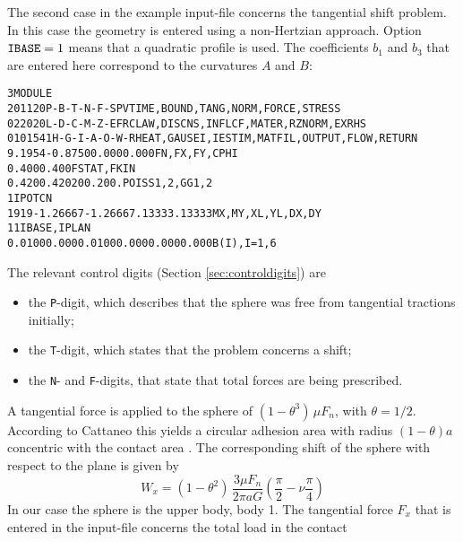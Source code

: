 \documentclass[12pt]{report}
\begin{document}
The second case in the example input-file concerns the tangential shift
problem. In this case the geometry is entered using a non-Hertzian approach.
Option ${\tt IBASE}=1$ means that a quadratic profile is used. The
coefficients $b_1$ and $b_3$ that are entered here correspond to the
curvatures $A$ and $B$:
\begin{alltt}\small
% Second case: using non-Hertzian geometry-description, and including the
%              tangential shift problem.

 3  MODULE
  201120     P-B-T-N-F-S        PVTIME, BOUND , TANG  , NORM , FORCE, STRESS
  022020     L-D-C-M-Z-E        FRCLAW, DISCNS, INFLCF, MATER, RZNORM, EXRHS
 0101541   H-G-I-A-O-W-R  HEAT, GAUSEI, IESTIM, MATFIL, OUTPUT, FLOW, RETURN
  9.1954     -0.8750       0.000       0.000         FN, FX, FY, CPHI
  0.400       0.400                                  FSTAT, FKIN
  0.420       0.420          200.        200.        POISS 1,2,  GG 1,2
    1                                                IPOTCN
   19   19  -1.26667  -1.26667   .13333     .13333   MX,MY,XL,YL,DX,DY
    1    1                                           IBASE, IPLAN
%    QUADRATIC UNDEFORMED DISTANCE
  0.0100    0.000     0.0100    0.000     0.000     0.000     B(I), I=1, 6
%    UNRESTRICTED PLANFORM
\end{alltt}
The relevant control digits (Section \ref{sec:controldigits}) are
\begin{itemize}
\item the {\tt P}-digit, which describes that the sphere was free from
        tangential tractions initially;
\item the {\tt T}-digit, which states that the problem concerns a shift;
\item the {\tt N}- and {\tt F}-digits, that state that total forces are
        being prescribed.
\end{itemize}
A tangential force is applied to the sphere of $(1-\theta^3)\,\mu F_n$,
with $\theta=1/2$. According to Cattaneo this yields a circular adhesion
area with radius $(1-\theta)a$ concentric with the contact area \cite[sec.
5.2.1.1]{Kalker1990}. The corresponding shift of the sphere with respect
to the plane is given by
\begin{equation}
        W_x = (1-\theta^2) \, \frac{3\mu F_n}{2\pi a G}
        \left( \frac{\pi}{2} - \nu \frac{\pi}{4} \right)
\end{equation}
In our case the sphere is the upper body, body 1. The tangential force $F_x$
that is entered in the input-file concerns the total load in the contact
\end{document}
